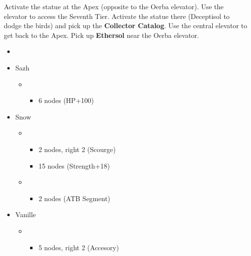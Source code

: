 Activate the statue at the Apex (opposite to the Oerba elevator).
Use the elevator to access the Seventh Tier.
Activate the statue there (Deceptisol to dodge the birds) and pick up the \textbf{Collector Catalog}.
Use the central elevator to get back to the Apex.
Pick up \textbf{Ethersol} near the Oerba elevator.

\begin{menu}
	\begin{itemize}
		\paradigm
		\begin{itemize}
			\item {}%
				  {\paradigmline{\syn}{(\rav)}{(\sab)}}%
			      {\paradigmline{\com}{\rav}{\rav}}%
			      {\paradigmline[4]{\rav}{\sen}{(\med)}}%
			      {\paradigmline{\com}{(\sen)}{(\med)}}%
			      {\paradigmline{\rav}{(\rav)}{\sab}}%
			      {\paradigmline{\com}{(\rav)}{(\med)}}%
		\end{itemize}
		\crystarium
		\begin{itemize}
			\item Sazh
				\begin{itemize}
					\item \rav
						\begin{itemize}
							\item 6 nodes (HP+100)
						\end{itemize}
				\end{itemize}
			\item Snow
				\begin{itemize}
					\item \com
						\begin{itemize}
							\item 2 nodes, right 2 (Scourge)
							\item 15 nodes (Strength+18)
						\end{itemize}
					\item \sen
						\begin{itemize}
							\item 2 nodes (ATB Segment)
						\end{itemize}
				\end{itemize}
			\item Vanille
				\begin{itemize}
					\item \med
						\begin{itemize}
							\item 5 nodes, right 2 (Accesory)
						\end{itemize}

\end{itemize}
\end{itemize}
\end{itemize}
\end{menu}
